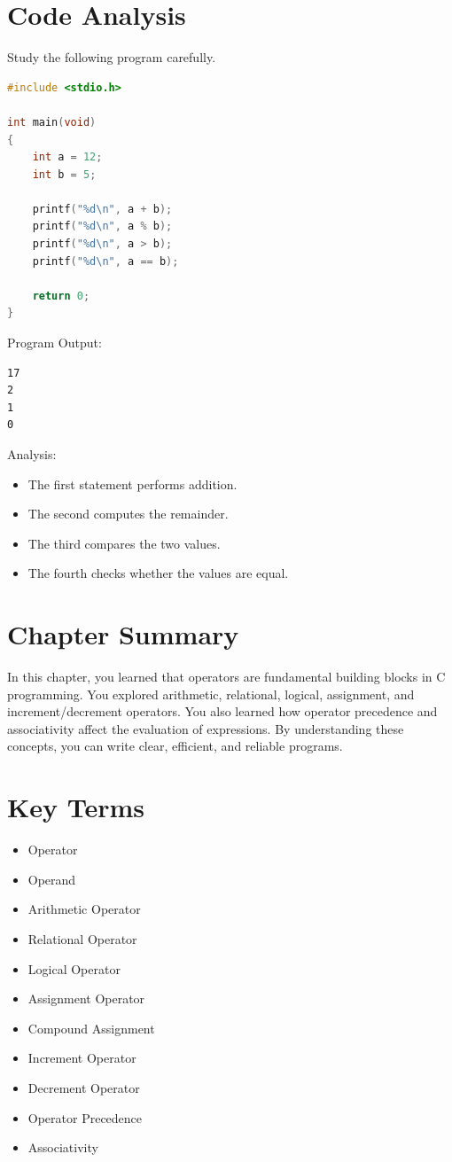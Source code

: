 \documentclass[12pt,openany]{book}
\begin{document}
\section{Code Analysis}

Study the following program carefully.

\begin{lstlisting}[language=C]
#include <stdio.h>

int main(void)
{
    int a = 12;
    int b = 5;

    printf("%d\n", a + b);
    printf("%d\n", a % b);
    printf("%d\n", a > b);
    printf("%d\n", a == b);

    return 0;
}
\end{lstlisting}

Program Output:

\begin{lstlisting}
17
2
1
0
\end{lstlisting}

Analysis:

\begin{itemize}
    \item The first statement performs addition.
    \item The second computes the remainder.
    \item The third compares the two values.
    \item The fourth checks whether the values are equal.
\end{itemize}
\section{Chapter Summary}

In this chapter, you learned that operators are fundamental building blocks in C programming. You explored arithmetic, relational, logical, assignment, and increment/decrement operators. You also learned how operator precedence and associativity affect the evaluation of expressions. By understanding these concepts, you can write clear, efficient, and reliable programs.

\section{Key Terms}

\begin{itemize}
    \item Operator
    \item Operand
    \item Arithmetic Operator
    \item Relational Operator
    \item Logical Operator
    \item Assignment Operator
    \item Compound Assignment
    \item Increment Operator
    \item Decrement Operator
    \item Operator Precedence
    \item Associativity
\end{itemize}
\end{document}
